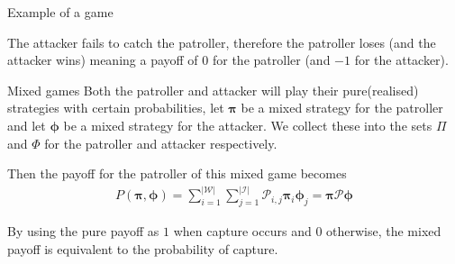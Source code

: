 \documentclass[11pt]{beamer}
\begin{document}
\begin{frame}{Example of a game}
\begin{center}

\end{center}
{
The attacker fails to catch the patroller, therefore the patroller loses (and the attacker wins) meaning a payoff of $0$ for the patroller (and $-1$ for the attacker).
}
\end{frame}

\begin{frame}{Mixed games}
Both the patroller and attacker will play their pure(realised) strategies with certain probabilities, let $\bm{\pi}$ be a mixed strategy for the patroller and let $\bm{\phi}$ be a mixed strategy for the attacker. We collect these into the sets $\Pi$ and $\Phi$ for the patroller and attacker respectively.

Then the payoff for the patroller of this mixed game becomes
\begin{align*}
P(\bm{\pi} ,\bm{\phi})=\sum\limits_{i=1}^{|\mathcal{W}|} \sum\limits_{j=1}^{|\mathcal{I}|} \mathcal{P}_{i,j} \bm{\pi} _{i} \bm{\phi}_{j}
=\bm{\pi} \mathcal{P} \bm{\phi}
\end{align*}

By using the pure payoff as $1$ when capture occurs and $0$ otherwise, the mixed payoff is equivalent to the probability of capture.
\end{frame}
\end{document}
